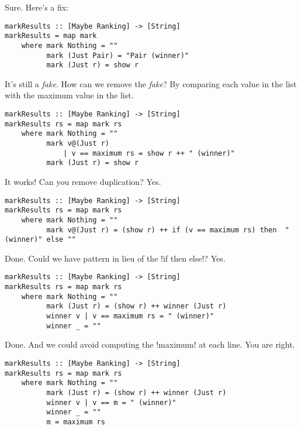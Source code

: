 \lhA \error Sure. Here's a fix:
\begin{lstlisting}[frame=single]
markResults :: [Maybe Ranking] -> [String]
markResults = map mark
    where mark Nothing = ""
          mark (Just Pair) = "Pair (winner)"
          mark (Just r) = show r
\end{lstlisting}
\success It's still a \emph{fake}.
\lhN How can we remove the \emph{fake}?
\lhA By comparing each value in the list with the maximum value in the list.
\begin{lstlisting}[frame=single]
markResults :: [Maybe Ranking] -> [String]
markResults rs = map mark rs
    where mark Nothing = ""
          mark v@(Just r) 
              | v == maximum rs = show r ++ " (winner)" 
          mark (Just r) = show r 
\end{lstlisting}
\success It works!
\lhN Can you remove duplication?
\lhA Yes.
\begin{lstlisting}[frame=single]
markResults :: [Maybe Ranking] -> [String]
markResults rs = map mark rs
    where mark Nothing = ""
          mark v@(Just r) = (show r) ++ if (v == maximum rs) then  " (winner)" else ""
\end{lstlisting}
\success Done.
\lhN Could we have pattern in lieu of the \il!if then else!?
\lhA Yes.
\begin{lstlisting}[frame=single]
markResults :: [Maybe Ranking] -> [String]
markResults rs = map mark rs
    where mark Nothing = ""
          mark (Just r) = (show r) ++ winner (Just r)
          winner v | v == maximum rs = " (winner)"
          winner _ = ""
\end{lstlisting}
\success Done.
\lhN And we could avoid computing the \il!maximum! at each line.
\lhA You are right.
\begin{lstlisting}[frame=single]
markResults :: [Maybe Ranking] -> [String]
markResults rs = map mark rs
    where mark Nothing = ""
          mark (Just r) = (show r) ++ winner (Just r)
          winner v | v == m = " (winner)"
          winner _ = ""
          m = maximum rs
\end{lstlisting}
\lhend
